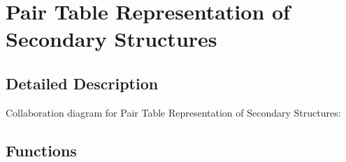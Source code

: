 \hypertarget{group__struct__utils__pair__table}{}\section{Pair Table Representation of Secondary Structures}
\label{group__struct__utils__pair__table}


\subsection{Detailed Description}
Collaboration diagram for Pair Table Representation of Secondary Structures\+:
\subsection*{Functions}
